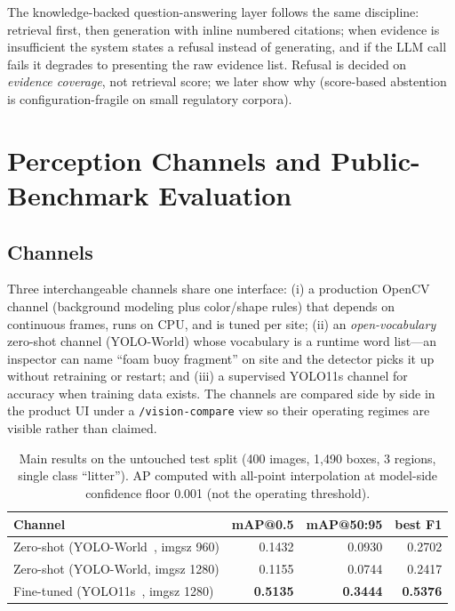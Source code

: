 \documentclass[conference]{IEEEtran}
\begin{document}
The knowledge-backed question-answering layer follows the same discipline:
retrieval first, then generation with inline numbered citations; when
evidence is insufficient the system states a refusal instead of generating,
and if the LLM call fails it degrades to presenting the raw evidence list.
Refusal is decided on \emph{evidence coverage}, not retrieval score; we
later show why (score-based abstention is configuration-fragile on small
regulatory corpora).

\section{Perception Channels and Public-Benchmark Evaluation}
\label{sec:perception}

\subsection{Channels}
Three interchangeable channels share one interface: (i) a production
OpenCV channel (background modeling plus color/shape rules) that depends on
continuous frames, runs on CPU, and is tuned per site; (ii) an
\emph{open-vocabulary} zero-shot channel (YOLO-World) whose vocabulary is a
runtime word list---an inspector can name ``foam buoy fragment'' on site and
the detector picks it up without retraining or restart; and (iii) a
supervised YOLO11s channel for accuracy when training data exists. The
channels are compared side by side in the product UI under a
\texttt{/vision-compare} view so their operating regimes are visible rather
than claimed.

\begin{table}[t]
\caption{Main results on the untouched test split (400 images, 1,490 boxes,
3 regions, single class ``litter''). AP computed with all-point
interpolation at model-side confidence floor 0.001 (not the operating
threshold).}
\label{tab:main}
\centering
\small
\begin{tabular}{lrrr}
\toprule
Channel & mAP@0.5 & mAP@50:95 & best F1 \\
\midrule
Zero-shot (YOLO-World~\cite{yoloworld}, imgsz 960) & 0.1432 & 0.0930 & 0.2702 \\
Zero-shot (YOLO-World, imgsz 1280) & 0.1155 & 0.0744 & 0.2417 \\
Fine-tuned (YOLO11s~\cite{yolo11}, imgsz 1280) & \textbf{0.5135} & \textbf{0.3444} &
\textbf{0.5376} \\
\bottomrule
\end{tabular}
\end{table}
\end{document}
